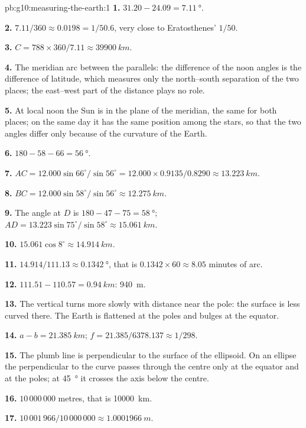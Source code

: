 \begin{solution}{pb:g10:measuring-the-earth:1}
\textbf{1.} $31.20 - 24.09 = \qty{7.11}{\degree}$.

\textbf{2.} $7.11/360 \approx 0.0198 = 1/50.6$, very close to
Eratosthenes' $1/50$.

\textbf{3.} $C = 788 \times 360/7.11 \approx \qty{39900}{km}$.

\textbf{4.} The meridian arc between the parallels: the difference of the
noon angles is the difference of latitude, which measures only the
north--south separation of the two places; the east--west part of the
distance plays no role.

\textbf{5.} At local noon the Sun is in the plane of the meridian, the same
for both places; on the same day it has the same position among the stars,
so that the two angles differ only because of the curvature of the Earth.

\textbf{6.} $180 - 58 - 66 = \qty{56}{\degree}$.

\textbf{7.} $AC = 12.000 \sin 66^\circ/\sin 56^\circ = 12.000 \times
0.9135/0.8290 \approx \qty{13.223}{km}$.

\textbf{8.} $BC = 12.000 \sin 58^\circ/\sin 56^\circ \approx \qty{12.275}{km}$.

\textbf{9.} The angle at $D$ is $180 - 47 - 75 = \qty{58}{\degree}$;
$AD = 13.223 \sin 75^\circ/\sin 58^\circ \approx \qty{15.061}{km}$.

\textbf{10.} $15.061 \cos 8^\circ \approx \qty{14.914}{km}$.

\textbf{11.} $14.914/111.13 \approx \qty{0.1342}{\degree}$, that is
$0.1342 \times 60 \approx 8.05$ minutes of arc.

\textbf{12.} $111.51 - 110.57 = \qty{0.94}{km}$: \qty{940}{m}.

\textbf{13.} The vertical turns more slowly with distance near the pole: the
surface is less curved there. The Earth is flattened at the poles and bulges
at the equator.

\textbf{14.} $a - b = \qty{21.385}{km}$; $f = 21.385/6378.137 \approx 1/298$.

\textbf{15.} The plumb line is perpendicular to the surface of the
ellipsoid. On an ellipse the perpendicular to the curve passes through the
centre only at the equator and at the poles; at \qty{45}{\degree} it crosses
the axis below the centre.

\textbf{16.} $10\,000\,000$ metres, that is \qty{10000}{km}.

\textbf{17.} $10\,001\,966/10\,000\,000 \approx \qty{1.0001966}{m}$.


\end{solution}
